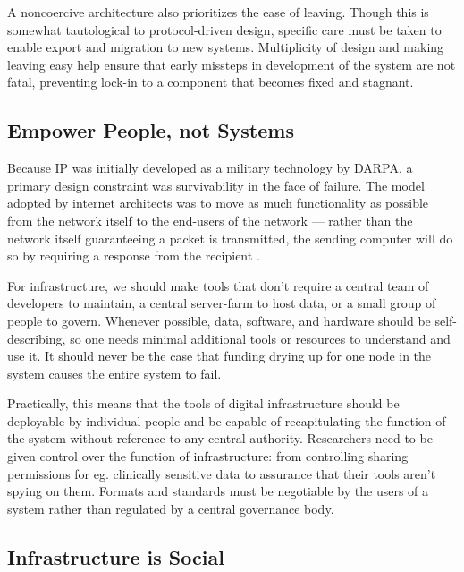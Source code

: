 A noncoercive architecture also prioritizes the ease of leaving. Though
this is somewhat tautological to protocol-driven design, specific care
must be taken to enable export and migration to new systems.
Multiplicity of design and making leaving easy help ensure that early
missteps in development of the system are not fatal, preventing lock-in
to a component that becomes fixed and stagnant.

\hypertarget{empower-people-not-systems}{%
\subsection{Empower People, not
Systems}\label{empower-people-not-systems}}

Because IP was initially developed as a military technology by DARPA, a
primary design constraint was survivability in the face of failure. The
model adopted by internet architects was to move as much functionality
as possible from the network itself to the end-users of the network ---
rather than the network itself guaranteeing a packet is transmitted, the
sending computer will do so by requiring a response from the recipient
\citep{clarkDesignPhilosophyDARPA1988} .

For infrastructure, we should make tools that don't require a central
team of developers to maintain, a central server-farm to host data, or a
small group of people to govern. Whenever possible, data, software, and
hardware should be self-describing,
so one needs minimal additional tools or resources to understand and use
it. It should never be the case that funding drying up for one node in
the system causes the entire system to fail.

Practically, this means that the tools of digital infrastructure should
be deployable by individual people and be capable of recapitulating the
function of the system without reference to any central authority.
Researchers need to be given control over the function of
infrastructure: from controlling sharing permissions for eg. clinically
sensitive data to assurance that their tools aren't spying on them.
Formats and standards must be negotiable by the users of a system rather
than regulated by a central governance body.

\hypertarget{infrastructure-is-social}{%
\subsection{Infrastructure is Social}\label{infrastructure-is-social}}

